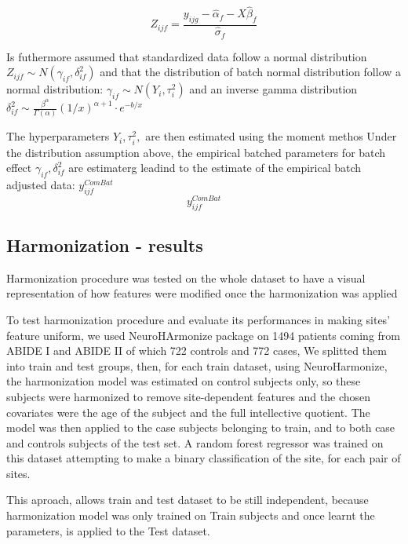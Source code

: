 \documentclass[a4paper,11pt]{article}
\begin{document}
\begin{equation}\label{eq:harmonization_std_data}
Z_{ijf} = \frac{y_{ijg}-\hat \alpha_f - X \hat \beta_f}{\hat \sigma_f}
\end{equation}

Is futhermore assumed that standardized data follow a normal distribution $Z_{ijf} \sim N(\gamma_{if}, \delta^2_{if}) $ and that the distribution
of batch normal distribution follow a normal distribution: $\gamma_{if} \sim N(Y_i, \tau^2_i)$ and an inverse gamma distribution
$\delta^2_{if} \sim \frac{\beta^{\alpha}}{\Gamma (\alpha)}(1/x)^{\alpha +1}\cdot e^{-b/x}$

The hyperparameters $Y_i,  \tau^2_i, $ are then estimated using the moment methos
Under the distribution assumption above, the empirical batched parameters for batch effect $\gamma_{if}, \delta^2_{if}$ are estimaterg leadind to the estimate of the empirical batch adjusted data: $y_{ijf}^{ComBat}$
\begin{equation}
y^{ComBat}_{ijf}
\end{equation}

\subsection{Harmonization - results}

Harmonization procedure was tested on the whole dataset to have a visual representation of how features were modified once the harmonization was applied

To test harmonization procedure and evaluate its performances in making sites' feature uniform, we used NeuroHArmonize package on 1494 patients coming from ABIDE I and ABIDE II of which 722 controls and 772 cases,
We splitted them into train and test groups, then, for each train dataset, using NeuroHarmonize, the harmonization model was estimated on control subjects only, so these subjects were harmonized to remove site-dependent features and the chosen covariates were the age of the subject and the full intellective quotient. The model was then applied to the case subjects belonging to train, and to both case and controls subjects of the test set.
A random forest regressor was trained on this dataset attempting to make a binary classification of the site, for each pair of sites.

This aproach, allows train and test dataset to be still independent, because harmonization model was only trained on Train subjects and once learnt the parameters, is applied to the Test dataset.
\end{document}
